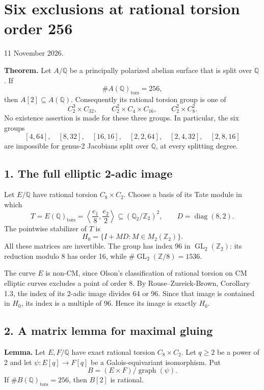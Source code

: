 \documentclass[
  11pt,
]{article}
\author{}
\date{}
\begin{document}
\section{Six exclusions at rational torsion order
256}\label{six-exclusions-at-rational-torsion-order-256}

11 November 2026.

\textbf{Theorem.} Let \(A/\mathbb Q\) be a principally polarized abelian
surface that is split over \(\mathbb Q\). If \[
\#A(\mathbb Q)_{\mathrm{tors}}=256,
\] then \(A[2]\subseteq A(\mathbb Q)\). Consequently its rational
torsion group is one of \[
C_2^3\times C_{32},\qquad
C_2^2\times C_4\times C_{16},\qquad
C_2^2\times C_8^2.
\] No existence assertion is made for these three groups. In particular,
the six groups \[
[4,64],\quad[8,32],\quad[16,16],\quad
[2,2,64],\quad[2,4,32],\quad[2,8,16]
\] are impossible for genus-2 Jacobians split over \(\mathbb Q\), at
every splitting degree.

\subsection{1. The full elliptic 2-adic
image}\label{the-full-elliptic-2-adic-image}

Let \(E/\mathbb Q\) have rational torsion \(C_8\times C_2\). Choose a
basis of its Tate module in which \[
T=E(\mathbb Q)_{\mathrm{tors}}
=\left\langle \frac{e_1}{8},\frac{e_2}{2}\right\rangle
\subseteq (\mathbb Q_2/\mathbb Z_2)^2,
\qquad D=\operatorname{diag}(8,2).
\] The pointwise stabilizer of \(T\) is \[
H_0=\{I+MD:M\in M_2(\mathbb Z_2)\}.
\] All these matrices are invertible. The group has index 96 in
\(\operatorname{GL}_2(\mathbb Z_2)\): its reduction modulo 8 has order
16, while \(\#\operatorname{GL}_2(\mathbb Z/8)=1536\).

The curve \(E\) is non-CM, since Olson's classification of rational
torsion on CM elliptic curves excludes a point of order 8. By
Rouse--Zureick-Brown, Corollary 1.3, the index of its 2-adic image
divides 64 or 96. Since that image is contained in \(H_0\), its index is
a multiple of 96. Hence its image is exactly \(H_0\).

\subsection{2. A matrix lemma for maximal
gluing}\label{a-matrix-lemma-for-maximal-gluing}

\textbf{Lemma.} Let \(E,F/\mathbb Q\) have exact rational torsion
\(C_8\times C_2\). Let \(q\ge2\) be a power of 2 and let
\(\psi:E[q]\to F[q]\) be a Galois-equivariant isomorphism. Put \[
B=(E\times F)/\operatorname{graph}(\psi).
\] If \(\#B(\mathbb Q)_{\mathrm{tors}}=256\), then \(B[2]\) is rational.
\end{document}
